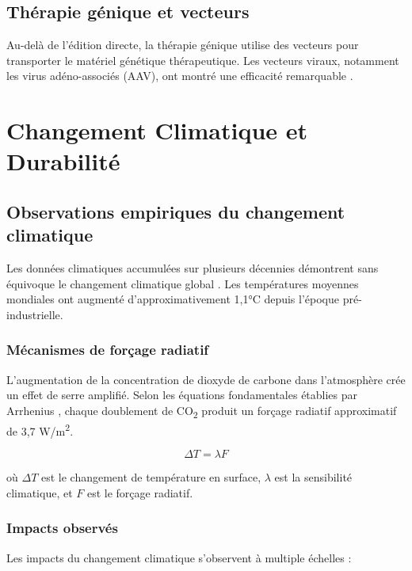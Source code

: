 \documentclass[12pt,a4paper,twoside,openright,openany]{book}
\begin{document}
	\section{Thérapie génique et vecteurs}
	
	Au-delà de l'édition directe, la thérapie génique utilise des vecteurs pour transporter le matériel génétique thérapeutique. Les vecteurs viraux, notamment les virus adéno-associés (AAV), ont montré une efficacité remarquable \cite{Naso2017}.
	
	\newpage
	
	\chapter{Changement Climatique et Durabilité}
	\label{ch:climat}
	
	\section{Observations empiriques du changement climatique}
	
	Les données climatiques accumulées sur plusieurs décennies démontrent sans équivoque le changement climatique global \cite{IPCC2021}. Les températures moyennes mondiales ont augmenté d'approximativement 1,1°C depuis l'époque pré-industrielle.
	
	\subsection{Mécanismes de forçage radiatif}
	
	L'augmentation de la concentration de dioxyde de carbone dans l'atmosphère crée un effet de serre amplifié. Selon les équations fondamentales établies par Arrhenius \cite{Arrhenius1896}, chaque doublement de CO\textsubscript{2} produit un forçage radiatif approximatif de 3,7 W/m\textsuperscript{2}.
	
	\[
	\Delta T = \lambda F
	\]
	
	où $\Delta T$ est le changement de température en surface, $\lambda$ est la sensibilité climatique, et $F$ est le forçage radiatif.
	
	\subsection{Impacts observés}
	
	Les impacts du changement climatique s'observent à multiple échelles :
	
\end{document}
